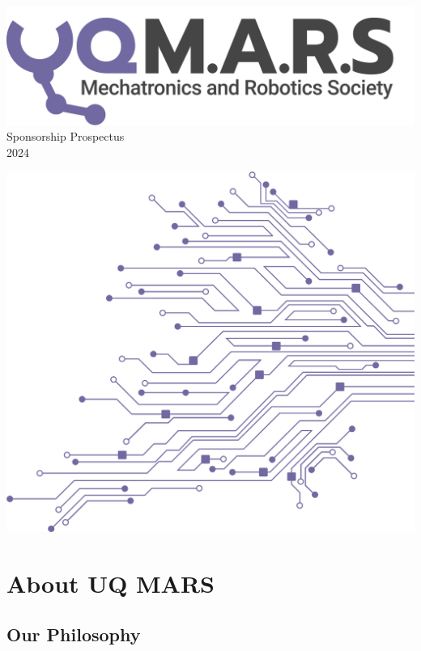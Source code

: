 \documentclass[a4paper,12pt]{report}
\begin{document}
\begin{titlepage}
    \begin{center}
        \vspace*{15mm}
        \includegraphics[width=0.7\paperwidth]{../assets/Logo (Dark).png} \\
        \vspace{1cm}
        \Huge Sponsorship Prospectus \\
        \huge \textcolor{turbo_purple}{2024}
    \end{center}
    \vfill
    \includegraphics[height=0.5\paperheight, right]{../assets/Pattern - PCB (Solid).png}
    \vspace*{10mm}
\end{titlepage}
\restoregeometry

\section*{About UQ MARS}
\subsection*{Our Philosophy}
\end{document}
